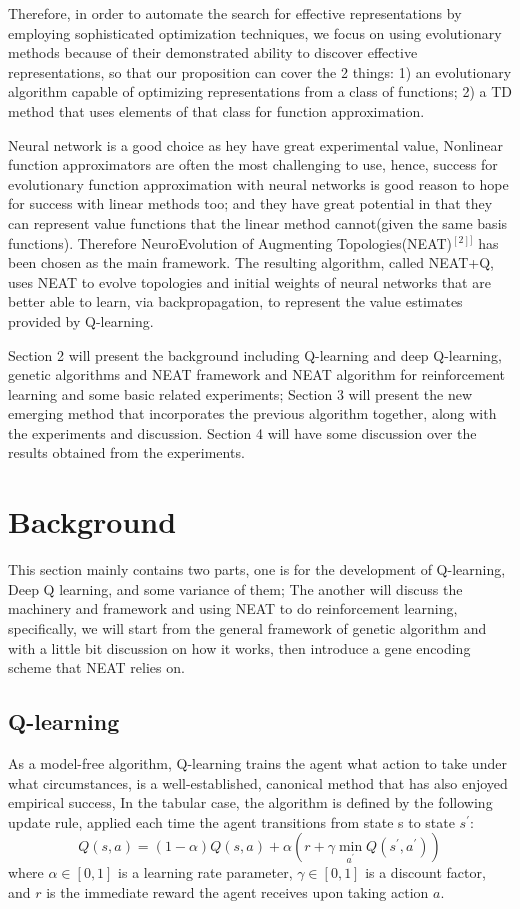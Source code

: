 \documentclass{article}
\begin{document}
Therefore, in order to automate the search for effective representations by employing sophisticated optimization techniques, we focus on using evolutionary methods 
because of their demonstrated ability to discover effective representations, so that our proposition can cover the 2 things: 1) an evolutionary algorithm capable of optimizing representations from a class of functions; 2) a TD method that uses elements of that class for function approximation. 

Neural network is a good choice as hey have great experimental value, Nonlinear function approximators are often the most challenging to use, hence, success for evolutionary function approximation with neural networks is good reason to hope for success with linear methods too;
and they have great potential in that they can represent value functions that the linear method cannot(given the same basis functions). Therefore NeuroEvolution of Augmenting Topologies(NEAT)$^{[2]]}$ has been chosen as the main 
framework. The resulting algorithm, called NEAT+Q, uses NEAT to evolve topologies and initial weights of neural networks that are better able to learn, via backpropagation, to represent the value estimates provided by Q-learning.

Section 2 will present the background including Q-learning and deep Q-learning, genetic algorithms and NEAT framework and NEAT algorithm for reinforcement learning and some basic related experiments;
Section 3 will present the new emerging method that incorporates the previous algorithm together, along with the experiments and discussion.
Section 4 will have some discussion over the results obtained from the experiments.

\section{Background}
This section mainly contains two parts, one is for the development of Q-learning, Deep Q learning, and some variance of them; The another will discuss the 
machinery and framework and using NEAT to do reinforcement learning, specifically, we will start from the general framework of genetic algorithm and with a little bit discussion
on how it works, then introduce a gene encoding scheme that NEAT relies on.
\subsection{Q-learning}

As a model-free algorithm, Q-learning trains the agent what action to take under what circumstances, is a well-established, canonical method that has also enjoyed empirical success,
In the tabular case, the algorithm is defined by the following update rule, applied each time the agent transitions from state s to state $s^{\prime}$:
\begin{equation}
   Q(s,a ) = (1 - \alpha) Q(s, a) + \alpha( r + \gamma  \min_{a^{\prime}}Q(s^{\prime} ,a^{\prime}) ) \label{q}
\end{equation}
where $\alpha \in [0, 1]$ is a learning rate parameter, $\gamma \in [0, 1]$ is a discount factor, and $r$ is the immediate reward the agent receives upon taking action $a$.
\end{document}
